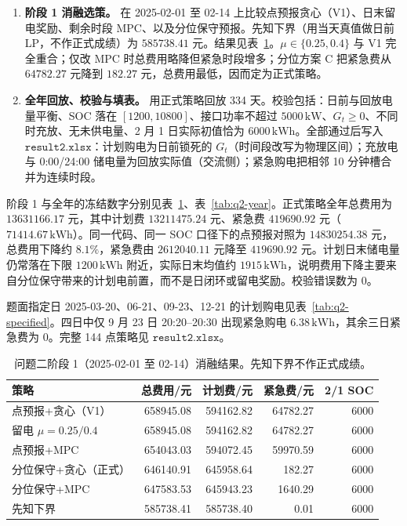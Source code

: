 \begin{enumerate}[label=\textbf{步骤\arabic*},leftmargin=2.6em,itemsep=0.45em]
\item \textbf{阶段 1 消融选策。}
在 2025-02-01 至 02-14 上比较点预报贪心（V1）、日末留电奖励、剩余时段 MPC、以及分位保守预报。先知下界（用当天真值做日前 LP，不作正式成绩）为 \(585738.41\) 元。结果见表~\ref{tab:q2-phase1}。\(\mu\in\{0.25,0.4\}\) 与 V1 完全重合；仅改 MPC 时总费用略降但紧急时段增多；分位方案 \(\mathrm{C}\) 把紧急费从 \(64782.27\) 元降到 \(182.27\) 元，总费用最低，因而定为正式策略。

\item \textbf{全年回放、校验与填表。}
用正式策略回放 334 天。校验包括：日前与回放电量平衡、SOC 落在 \([1200,10800]\)、接口功率不超过 \(5000\,\mathrm{kW}\)、\(G_t\ge 0\)、不同时充放、无未供电量、2 月 1 日实际初值恰为 \(6000\,\mathrm{kWh}\)。全部通过后写入 \(\texttt{result2.xlsx}\)：计划购电为日前锁死的 \(G_t\)（时间段改写为物理区间）；充放电与 0:00/24:00 储电量为回放实际值（交流侧）；紧急购电把相邻 10 分钟槽合并为连续时段。
\end{enumerate}

阶段 1 与全年的冻结数字分别见表~\ref{tab:q2-phase1}、表~\ref{tab:q2-year}。正式策略全年总费用为 \(13631166.17\) 元，其中计划费 \(13211475.24\) 元、紧急费 \(419690.92\) 元（\(71414.67\,\mathrm{kWh}\)）。同一代码、同一 SOC 口径下的点预报对照为 \(14830254.38\) 元，总费用下降约 \(8.1\%\)，紧急费由 \(2612040.11\) 元降至 \(419690.92\) 元。计划日末储电量仍常落在下限 \(1200\,\mathrm{kWh}\) 附近，实际日末均值约 \(1915\,\mathrm{kWh}\)，说明费用下降主要来自分位保守带来的计划电前置，而不是日闭环或留电奖励。校验错误数为 0。

题面指定日 2025-03-20、06-21、09-23、12-21 的计划购电见表~\ref{tab:q2-specified}。四日中仅 9 月 23 日 20:20--20:30 出现紧急购电 \(6.38\,\mathrm{kWh}\)，其余三日紧急费为 0。完整 144 点策略见 \(\texttt{result2.xlsx}\)。

\begin{table}[htbp]
  \centering
  \caption{问题二阶段 1（2025-02-01 至 02-14）消融结果。先知下界不作正式成绩。}
  \label{tab:q2-phase1}
  \begin{tabular}{lrrrr}
    \toprule
    策略 & 总费用/元 & 计划费/元 & 紧急费/元 & 2/1 SOC \\
    \midrule
    点预报+贪心（V1） & 658945.08 & 594162.82 & 64782.27 & 6000 \\
    留电 \(\mu=0.25/0.4\) & 658945.08 & 594162.82 & 64782.27 & 6000 \\
    点预报+MPC & 654043.03 & 594072.45 & 59970.59 & 6000 \\
    分位保守+贪心（正式） & 646140.91 & 645958.64 & 182.27 & 6000 \\
    分位保守+MPC & 647583.53 & 645943.23 & 1640.29 & 6000 \\
    先知下界 & 585738.41 & 585738.40 & 0.01 & 6000 \\
    \bottomrule
  \end{tabular}
\end{table}

